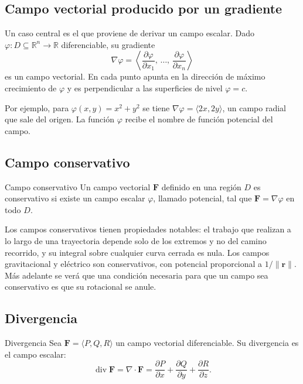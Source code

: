 \subsection{Campo vectorial producido por un gradiente}

Un caso central es el que proviene de derivar un campo escalar. Dado $\varphi: D \subseteq \mathbb{R}^n \to \mathbb{R}$ diferenciable, su gradiente
\[
\nabla \varphi = \left\langle \frac{\partial \varphi}{\partial x_1},\, \dots,\, \frac{\partial \varphi}{\partial x_n} \right\rangle
\]
es un campo vectorial. En cada punto apunta en la dirección de máximo crecimiento de $\varphi$ y es perpendicular a las superficies de nivel $\varphi = c$.

Por ejemplo, para $\varphi(x, y) = x^2 + y^2$ se tiene $\nabla \varphi = \langle 2x, 2y \rangle$, un campo radial que sale del origen. La función $\varphi$ recibe el nombre de función potencial del campo.

\subsection{Campo conservativo}

\begin{mydefinition}{Campo conservativo}
Un campo vectorial $\mathbf{F}$ definido en una región $D$ es conservativo si existe un campo escalar $\varphi$, llamado potencial, tal que $\mathbf{F} = \nabla \varphi$ en todo $D$.
\end{mydefinition}

Los campos conservativos tienen propiedades notables: el trabajo que realizan a lo largo de una trayectoria depende solo de los extremos y no del camino recorrido, y su integral sobre cualquier curva cerrada es nula. Los campos gravitacional y eléctrico son conservativos, con potencial proporcional a $1/\|\mathbf{r}\|$. Más adelante se verá que una condición necesaria para que un campo sea conservativo es que su rotacional se anule.

\subsection{Divergencia}

\begin{mydefinition}{Divergencia}
Sea $\mathbf{F} = \langle P, Q, R \rangle$ un campo vectorial diferenciable. Su divergencia es el campo escalar:
\[
\operatorname{div} \mathbf{F} = \nabla \cdot \mathbf{F}
= \frac{\partial P}{\partial x} + \frac{\partial Q}{\partial y} + \frac{\partial R}{\partial z}.
\]
\end{mydefinition}

